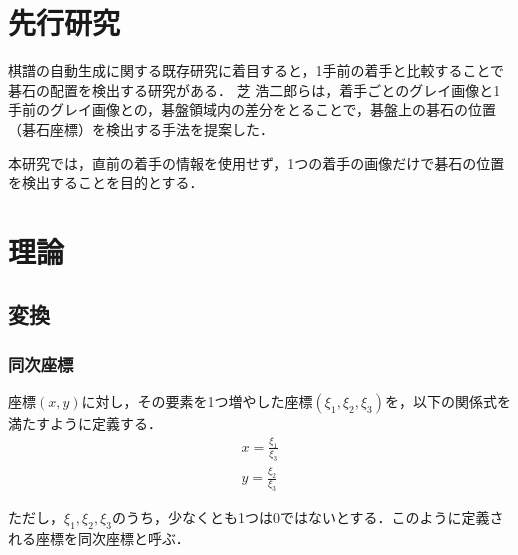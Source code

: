 \documentclass[openright]{nitocs}
\numberwithin{equation}{section}
\begin{document}
    \section{先行研究} %
        棋譜の自動生成に関する既存研究に着目すると，1手前の着手と比較することで碁石の配置を検出する研究\cite{PilotStudy}がある．
        芝 浩二郎らは，着手ごとのグレイ画像と1手前のグレイ画像との，碁盤領域内の差分をとることで，碁盤上の碁石の位置（碁石座標）を検出する手法を提案した．
        
        本研究では，直前の着手の情報を使用せず，1つの着手の画像だけで碁石の位置を検出することを目的とする．

    \section{理論} %
    \label{config}
        \subsection{変換}
            \subsubsection{同次座標}
                座標$(x,y)$に対し，その要素を1つ増やした座標$(\xi_1,\xi_2,\xi_3)$を，以下の関係式を満たすように定義する．\\
                \begin{equation} %
                    \begin{split} %
                        x = \frac{\xi_1}{\xi_3} \\ 
                        y = \frac{\xi_2}{\xi_3}
                    \end{split}
                    \label{Homogeneous}
                \end{equation}

                ただし，$\xi_1,\xi_2,\xi_3$のうち，少なくとも1つは0ではないとする．このように定義される座標を同次座標と呼ぶ\cite{Homogenous}．
\end{document}
